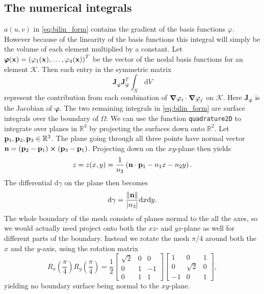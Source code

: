 \subsection{The numerical integrals}
$a(u,v)$ in \eqref{eq:bilin_form} contains the gradient of the basis functions $\varphi$. However because of the linearity of the basis functions this integral will simply be the volume of each element multiplied by a constant. Let $\pmb{\varphi}(\vb{x}) = \left(\varphi_1(\vb{x}),\dots,\varphi_4(\vb{x})\right)^T$ be the vector of the nodal basis functions for an element $\mathcal{K}$. Then each entry in the symmetric matrix
\begin{equation}
    \pmb{J}_{\pmb{\varphi}}^{\phantom{}} \pmb{J}_{\pmb{\varphi}}^T\int_\mathcal{K} \! \mathrm{d}V
\end{equation}
represent the contribution from each combination of $\grad{\varphi_i}\cdot\grad{\varphi_j}$ on $\mathcal{K}$. Here $\pmb{J}_{\pmb{\varphi}}$ is the Jacobian of $\pmb{\varphi}$. The two remaining integrals in \eqref{eq:bilin_form} are surface integrals over the boundary of $\Omega$. We can use the function \texttt{quadrature2D} to integrate over planes in $\mathbb{R}^3$ by projecting the surfaces down onto $\mathbb{R}^2$. Let $\vb{p}_1,\vb{p}_2,\vb{p}_3 \in \mathbb{R}^3$. The plane going through all three points have normal vector $\vb{n} = (\vb{p}_2-\vb{p}_1)\cross (\vb{p}_3-\vb{p}_1)$. Projecting down on the $xy$-plane then yields
\begin{equation}
    z = z(x,y)=\frac{1}{n_3}\left(\vb{n}\cdot \vb{p}_1-n_1x-n_2y\right).
\end{equation}
The differential $\mathrm{d}\gamma$ on the plane then becomes
\begin{equation}
    \mathrm{d}\gamma = \frac{\norm{\vb{n}}}{\abs{n_3}}\mathrm{d}x\mathrm{d}y.
\end{equation}
The whole boundary of the mesh consists of planes normal to the all the axes, so we would actually need project onto both the $xz$- and $yz$-plane as well for different parts of the boundary. Instead we rotate the mesh $\pi/4$ around both the $x$ and the $y$-axis, using the rotation matrix
\begin{equation}
    R_x\left(\frac{\pi}{4}\right)R_y\left(\frac{\pi}{4}\right) = \frac{1}{2}
    \begin{bmatrix}
        \sqrt{2} & 0 & 0 \\
        0 & 1 & -1 \\
        0 & 1 & 1
     \end{bmatrix}
     \begin{bmatrix}
        1 & 0 & 1 \\
        0 & \sqrt{2} & 0 \\
        -1 & 0 & 1
     \end{bmatrix},
\end{equation}
yielding no boundary surface being normal to the $xy$-plane.

